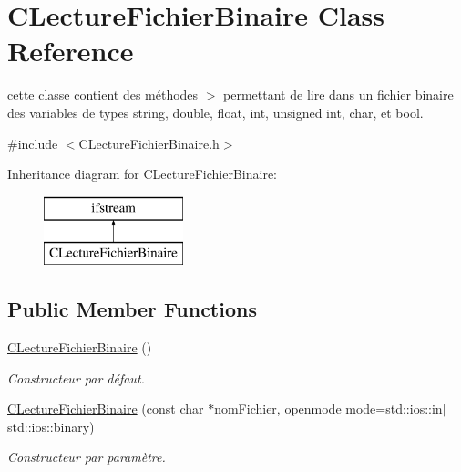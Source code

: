 \hypertarget{class_c_lecture_fichier_binaire}{}\section{C\+Lecture\+Fichier\+Binaire Class Reference}
\label{class_c_lecture_fichier_binaire}


cette classe contient des méthodes $>$ permettant de lire dans un fichier binaire des variables de types string, double, float, int, unsigned int, char, et bool.  




{\ttfamily \#include $<$C\+Lecture\+Fichier\+Binaire.\+h$>$}

Inheritance diagram for C\+Lecture\+Fichier\+Binaire\+:\begin{figure}[H]
\begin{center}
\leavevmode
\includegraphics[height=2.000000cm]{class_c_lecture_fichier_binaire}
\end{center}
\end{figure}
\subsection*{Public Member Functions}
\begin{DoxyCompactItemize}
\item 
\hyperlink{group__utilitaire_ga3a259905a2c14513846e6ecb8cf476ad}{C\+Lecture\+Fichier\+Binaire} ()
\begin{DoxyCompactList}\small\item\em Constructeur par défaut. \end{DoxyCompactList}\item 
\hyperlink{group__utilitaire_gac16ebab7b172408c2ba14605f61f0f84}{C\+Lecture\+Fichier\+Binaire} (const char $\ast$nom\+Fichier, openmode mode=std\+::ios\+::in$\vert$std\+::ios\+::binary)
\begin{DoxyCompactList}\small\item\em Constructeur par paramètre. \end{DoxyCompactList}\end{DoxyCompactItemize}
